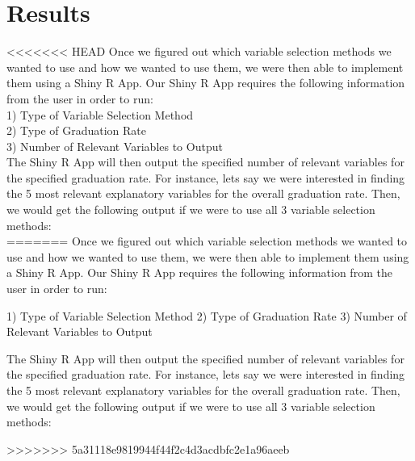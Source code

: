 \documentclass{article}
\begin{document}


\section{Results}
<<<<<<< HEAD
Once we figured out which variable selection methods we wanted to use and how we wanted to use them, we were then able to implement them using a Shiny R App. Our Shiny R App requires the following information from the user in order to run:\\

1) Type of Variable Selection Method\\
2) Type of Graduation Rate\\
3) Number of Relevant Variables to Output\\

The Shiny R App will then output the specified number of relevant variables for the specified graduation rate. For instance, lets say we were interested in finding the 5 most relevant explanatory variables for the overall graduation rate. Then, we would get the following output if we were to use all 3 variable selection methods:\\
=======
Once we figured out which variable selection methods we wanted to use and how we wanted to use them, we were then able to implement them using a Shiny R App. Our Shiny R App requires the following information from the user in order to run:

1) Type of Variable Selection Method
2) Type of Graduation Rate
3) Number of Relevant Variables to Output

The Shiny R App will then output the specified number of relevant variables for the specified graduation rate. For instance, lets say we were interested in finding the 5 most relevant explanatory variables for the overall graduation rate. Then, we would get the following output if we were to use all 3 variable selection methods:

>>>>>>> 5a31118e9819944f44f2c4d3acdbfc2e1a96aeeb
\end{document}
